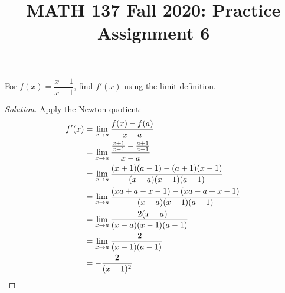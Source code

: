 \documentclass{agony}
\title{MATH 137 Fall 2020: Practice Assignment 6}
\begin{document}
\thispagestyle{firstpage}

\textbf{\thetitle}

\question For $f(x)=\dfrac{x+1}{x-1}$, find $f'(x)$ using the limit definition.
\begin{proof}[Solution]
  Apply the Newton quotient:
  \begin{align*}
    f'(x) & = \lim\limits_{x\to a} \frac{f(x)-f(a)}{x-a}                           \\
          & = \lim\limits_{x\to a} \frac{\frac{x+1}{x-1} - \frac{a+1}{a-1}}{x-a}   \\
          & = \lim\limits_{x\to a} \frac{(x+1)(a-1) - (a+1)(x-1)}{(x-a)(x-1)(a-1)} \\
          & = \lim\limits_{x\to a} \frac{(xa+a-x-1) - (xa-a+x-1)}{(x-a)(x-1)(a-1)} \\
          & = \lim\limits_{x\to a} \frac{-2(x-a)}{(x-a)(x-1)(a-1)}                 \\
          & = \lim\limits_{x\to a} \frac{-2}{(x-1)(a-1)}                           \\
          & = -\frac{2}{(x-1)^2} \qedhere
  \end{align*}
\end{proof}
\end{document}
